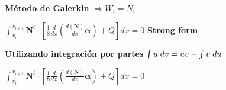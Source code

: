 \documentclass[12pt]{report}
\begin{document}
        \textbf{Método de Galerkin $\Rightarrow W_i = N_i$}
        \begin{center}
            $\displaystyle \int_{x_i}^{x_{i+1}} \textbf{N}^t \cdot \left[\frac{1}{8}\frac{d}{dx} \left( \frac{d(\textbf{N})}{dx} \bm{\alpha}\right) + Q  \right] dx = 0$  \hspace{1cm} \textbf{Strong form} 
        \end{center}

        \textbf{Utilizando integración por partes } $\int u \hspace{0.1cm} dv = uv- \int v \hspace{0.1cm} du$
        \begin{center}
            $\displaystyle \int_{x_i}^{x_{i+1}} \textbf{N}^t \cdot \left[\frac{1}{8}\frac{d}{dx} \left( \frac{d(\textbf{N})}{dx} \bm{\alpha}\right) + Q  \right] dx = 0$ 
        \end{center}

    
\end{document}

